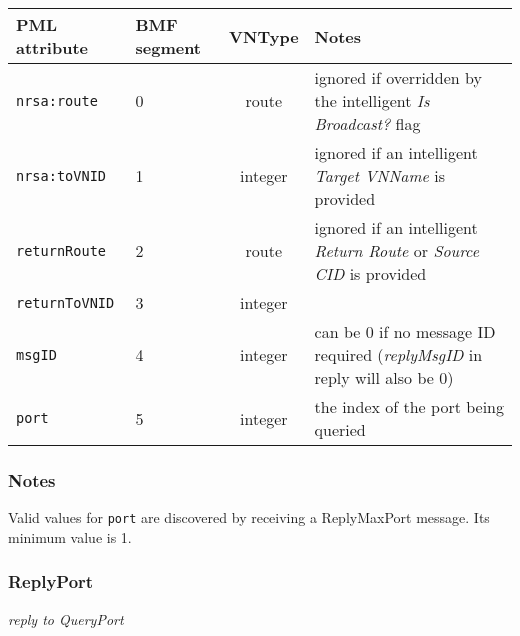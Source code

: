 \documentclass[pdftex,a4paper]{article}
\newcommand{\XMLfont}[1]{{\tt \small #1}}
\begin{document}
\begin{table}[!h]
  \begin{center}
    \label{tab:QueryPort}
    \begin{tabular}{|l|p{13mm}|c|p{60mm}|}
      \hline

      \textbf{PML attribute} & \textbf{BMF segment} & \textbf{VNType}
      & \textbf{Notes} \\\hline

      \XMLfont{nrsa:route} & 0 & route & ignored if overridden by the
      intelligent {\em Is Broadcast?} flag \\\hline

      \XMLfont{nrsa:toVNID} & 1 & integer & ignored if an intelligent {\em
      Target VNName} is provided \\\hline

      \XMLfont{returnRoute} & 2 & route & ignored if an
      intelligent {\em Return Route} or {\em Source CID} is provided
      \\\hline

      \XMLfont{returnToVNID} & 3 & integer & \\\hline

      \XMLfont{msgID} & 4 & integer & can be 0 if no message ID
      required ({\em replyMsgID} in reply will also be 0) \\\hline

      \XMLfont{port} & 5 & integer & the index of the port being
      queried \\\hline

    \end{tabular}
  \end{center}
\end{table}

\subsubsection*{Notes}

Valid values for \XMLfont{port} are discovered by receiving a
ReplyMaxPort message. Its minimum value is 1.

\subsubsection{ReplyPort}
{\em reply to QueryPort}
\end{document}
